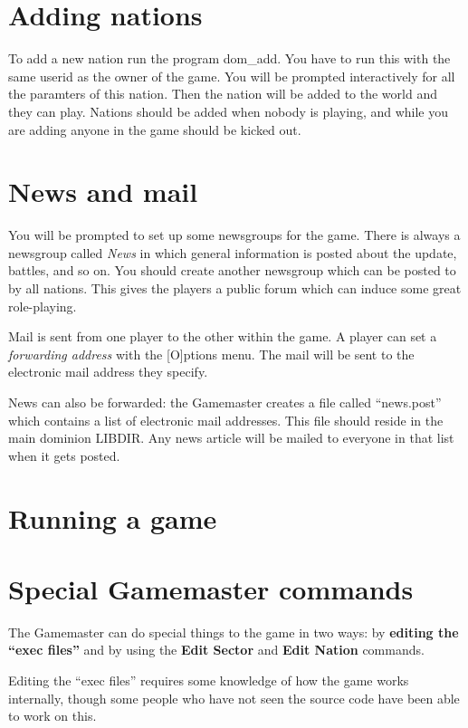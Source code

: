 \chapter{Adding nations}

To add a new nation run the program dom\_add.  You have to run this
with the same userid as the owner of the game.  You will be prompted
interactively for all the paramters of this nation.  Then the nation
will be added to the world and they can play.  Nations should be added
when nobody is playing, and while you are adding anyone in the game
should be kicked out.

\chapter{News and mail}

You will be prompted to set up some newsgroups for the game.  There is
always a newsgroup called {\em News} in which general information is
posted about the update, battles, and so on.  You should create
another newsgroup which can be posted to by all nations.  This gives
the players a public forum which can induce some great role-playing.

Mail is sent from one player to the other within the game.  A player
can set a {\em forwarding address} with the [O]ptions menu.  The mail
will be sent to the electronic mail address they specify.

News can also be forwarded: the Gamemaster creates a file called
``news.post'' which contains a list of electronic mail addresses.
This file should reside in the main dominion LIBDIR.  Any news article
will be mailed to everyone in that list when it gets posted.

\chapter{Running a game}

\chapter{Special Gamemaster commands}

The Gamemaster can do special things to the game in two ways: by {\bf
editing the ``exec files''} and by using the {\bf Edit Sector} and {\bf
Edit Nation} commands.

Editing the ``exec files'' requires some knowledge of how the game
works internally, though some people who have not seen the source code
have been able to work on this.

